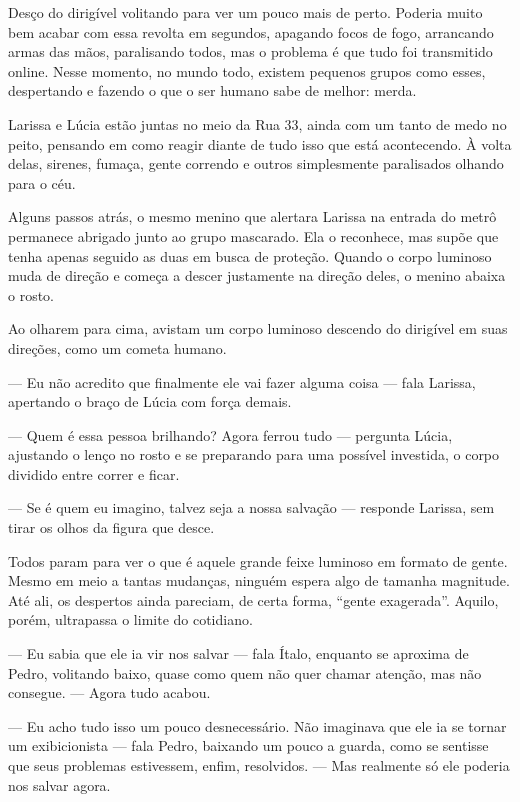 Desço do dirigível volitando para ver um pouco mais de perto. Poderia muito bem acabar com essa revolta em segundos, apagando focos de fogo, arrancando armas das mãos, paralisando todos, mas o problema é que tudo foi transmitido online. Nesse momento, no mundo todo, existem pequenos grupos como esses, despertando e fazendo o que o ser humano sabe de melhor: merda.

\bigskip

Larissa e Lúcia estão juntas no meio da Rua 33, ainda com um tanto de medo no peito, pensando em como reagir diante de tudo isso que está acontecendo. À volta delas, sirenes, fumaça, gente correndo e outros simplesmente paralisados olhando para o céu.

Alguns passos atrás, o mesmo menino que alertara Larissa na entrada do metrô permanece abrigado junto ao grupo mascarado. Ela o reconhece, mas supõe que tenha apenas seguido as duas em busca de proteção. Quando o corpo luminoso muda de direção e começa a descer justamente na direção deles, o menino abaixa o rosto.

Ao olharem para cima, avistam um corpo luminoso descendo do dirigível em suas direções, como um cometa humano.

— Eu não acredito que finalmente ele vai fazer alguma coisa — fala Larissa, apertando o braço de Lúcia com força demais.

— Quem é essa pessoa brilhando? Agora ferrou tudo — pergunta Lúcia, ajustando o lenço no rosto e se preparando para uma possível investida, o corpo dividido entre correr e ficar.

— Se é quem eu imagino, talvez seja a nossa salvação — responde Larissa, sem tirar os olhos da figura que desce.

Todos param para ver o que é aquele grande feixe luminoso em formato de gente. Mesmo em meio a tantas mudanças, ninguém espera algo de tamanha magnitude. Até ali, os despertos ainda pareciam, de certa forma, “gente exagerada”. Aquilo, porém, ultrapassa o limite do cotidiano.

— Eu sabia que ele ia vir nos salvar — fala Ítalo, enquanto se aproxima de Pedro, volitando baixo, quase como quem não quer chamar atenção, mas não consegue. — Agora tudo acabou.

— Eu acho tudo isso um pouco desnecessário. Não imaginava que ele ia se tornar um exibicionista — fala Pedro, baixando um pouco a guarda, como se sentisse que seus problemas estivessem, enfim, resolvidos. — Mas realmente só ele poderia nos salvar agora.

